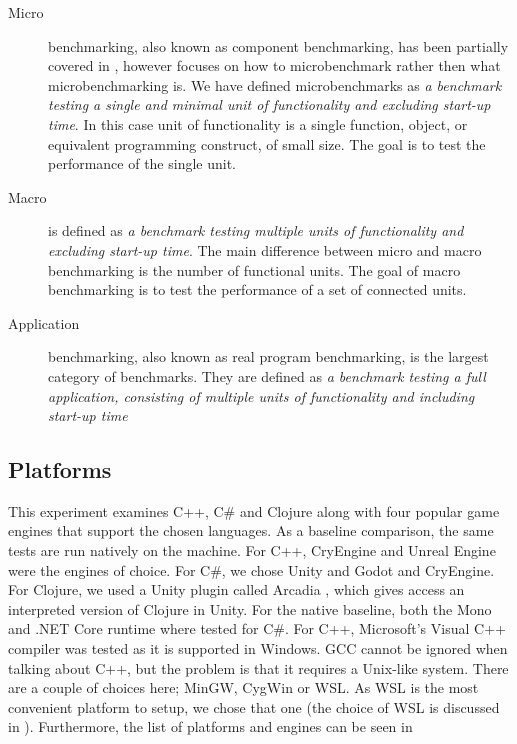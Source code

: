 \begin{description}
    \item[Micro] benchmarking, also known as component benchmarking, has been partially covered in , however  focuses on how to microbenchmark rather then what microbenchmarking is. We have defined microbenchmarks as \textit{a benchmark testing a single and minimal unit of functionality and excluding start-up time}. In this case unit of functionality is a single function, object, or equivalent programming construct, of small size. The goal is to test the performance of the single unit.
    \item[Macro] is defined as \textit{a benchmark testing multiple units of functionality and excluding start-up time}. The main difference between micro and macro benchmarking is the number of functional units. The goal of macro benchmarking is to test the performance of a set of connected units.
    \item[Application] benchmarking, also known as real program benchmarking, is the largest category of benchmarks. They are defined as \textit{a benchmark testing a full application, consisting of multiple units of functionality and including start-up time}
\end{description}

\subsection{Platforms}
This experiment examines C++, C\# and Clojure along with four popular game engines that support the chosen languages. As a baseline comparison, the same tests are run natively on the machine. For C++, CryEngine and Unreal Engine were the engines of choice. For C\#, we chose Unity and Godot and CryEngine. For Clojure, we used a Unity plugin called Arcadia \cite{arcadia:github}, which gives access an interpreted version of Clojure in Unity. For the native baseline, both the Mono and .NET Core runtime where tested for C\#. For C++, Microsoft's Visual C++ compiler was tested as it is supported in Windows. \ac{GCC} cannot be ignored when talking about C++, but the problem is that it requires a Unix-like system. There are a couple of choices here; MinGW, CygWin or \ac{WSL}. As \ac{WSL} is the most convenient platform to setup, we chose that one (the choice of \ac{WSL} is discussed in ). Furthermore, the list of platforms and engines can be seen in 

